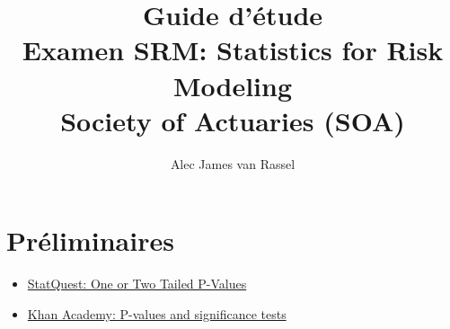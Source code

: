 \documentclass[12pt, titlepage, french]{report}
\title{
	Guide d'étude	\\
	\large Examen SRM: Statistics for Risk Modeling 	\\
	Society of Actuaries (SOA)}
\date{}
\author{Alec James van Rassel}
\begin{document}
\maketitle

\tableofcontents

\clearpage

\part*{Préliminaires}

\begin{YTB_vids}
\begin{itemize}
	\item	\href{https://www.youtube.com/watch?v=bsZGt-caXO4}{StatQuest: One or Two Tailed P-Values}
	\item	\href{https://www.youtube.com/watch?v=KS6KEWaoOOE}{Khan Academy: P-values and significance tests}
\end{itemize}
\end{YTB_vids}
\end{document}
